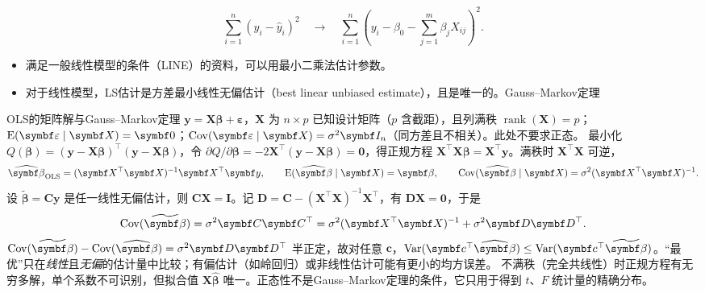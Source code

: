 \begin{center}
{}
\end{center}

\[
\sum_{i=1}^n(y_i-\widehat y_i)^2
\quad\longrightarrow\quad
\sum_{i=1}^n\left(y_i-\beta_0-\sum_{j=1}^m\beta_jX_{ij}\right)^2.
\]
\begin{itemize}
\item 满足一般线性模型的条件（LINE）的资料，可以用最小二乘法估计参数。
\item 对于线性模型，LS估计是方差最小线性无偏估计（best linear unbiased estimate），且是唯一的。\hfill Gauss--Markov定理
\end{itemize}
\begin{derivation}{OLS的矩阵解与Gauss--Markov定理}
$\bm y=\bm X\bm\beta+\bm\varepsilon$，$\bm X$ 为 $n\times p$ 已知设计矩阵（$p$ 含截距），且列满秩 $\operatorname{rank}(\bm X)=p$；$\E(\bm\varepsilon\mid\bm X)=\bm 0$；$\Cov(\bm\varepsilon\mid\bm X)=\sigma^2\bm I_n$（同方差且不相关）。此处不要求正态。
最小化 $Q(\bm\beta)=(\bm y-\bm X\bm\beta)^\top(\bm y-\bm X\bm\beta)$，令 $\partial Q/\partial\bm\beta=-2\bm X^\top(\bm y-\bm X\bm\beta)=\bm 0$，得正规方程 $\bm X^\top\bm X\bm\beta=\bm X^\top\bm y$。满秩时 $\bm X^\top\bm X$ 可逆，
\[
\widehat{\bm\beta}_{\mathrm{OLS}}=(\bm X^\top\bm X)^{-1}\bm X^\top\bm y,\qquad
\E(\widehat{\bm\beta}\mid\bm X)=\bm\beta,\qquad
\Cov(\widehat{\bm\beta}\mid\bm X)=\sigma^2(\bm X^\top\bm X)^{-1}.
\]
设 $\widetilde{\bm\beta}=\bm C\bm y$ 是任一线性无偏估计，则 $\bm C\bm X=\bm I$。记 $\bm D=\bm C-(\bm X^\top\bm X)^{-1}\bm X^\top$，有 $\bm D\bm X=\bm 0$，于是
\[
\Cov(\widetilde{\bm\beta})=\sigma^2\bm C\bm C^\top=\sigma^2(\bm X^\top\bm X)^{-1}+\sigma^2\bm D\bm D^\top .
\]
$\Cov(\widetilde{\bm\beta})-\Cov(\widehat{\bm\beta})=\sigma^2\bm D\bm D^\top$ 半正定，故对任意 $\bm c$，$\Var(\bm c^\top\widehat{\bm\beta})\le\Var(\bm c^\top\widetilde{\bm\beta})$。“最优”只在\emph{线性}且\emph{无偏}的估计量中比较；有偏估计（如岭回归）或非线性估计可能有更小的均方误差。
不满秩（完全共线性）时正规方程有无穷多解，单个系数不可识别，但拟合值 $\bm X\widehat{\bm\beta}$ 唯一。正态性不是Gauss--Markov定理的条件，它只用于得到 $t$、$F$ 统计量的精确分布。
\end{derivation}
